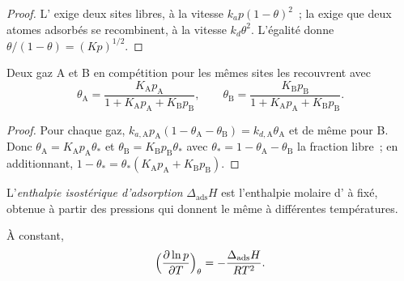 \begin{proof}
L' exige deux sites libres, à la vitesse $k_ap(1 - \theta)^2$~;
la  exige que deux atomes adsorbés se recombinent, à la
vitesse $k_d\theta^2$. L'égalité donne $\theta/(1 - \theta) =
(Kp)^{1/2}$.
\end{proof}

\begin{proposition}\label{prop:b3:surfaces-catalysis:competitive}
Deux gaz A et B en compétition pour les mêmes sites les recouvrent avec
\[
  \theta_{\mathrm A} = \frac{K_{\mathrm A}p_{\mathrm A}}{1 + K_{\mathrm A}p_{\mathrm A} + K_{\mathrm B}p_{\mathrm B}}, \qquad
  \theta_{\mathrm B} = \frac{K_{\mathrm B}p_{\mathrm B}}{1 + K_{\mathrm A}p_{\mathrm A} + K_{\mathrm B}p_{\mathrm B}} .
\]
\end{proposition}

\begin{proof}
Pour chaque gaz, $k_{a,\mathrm A}p_{\mathrm A}(1 - \theta_{\mathrm A} - \theta_{\mathrm B}) = k_{d,\mathrm A}\theta_{\mathrm A}$
et de même pour B. Donc
$\theta_{\mathrm A} = K_{\mathrm A}p_{\mathrm A}\theta_\ast$ et $\theta_{\mathrm B} = K_{\mathrm B}p_{\mathrm B}\theta_\ast$
avec $\theta_\ast = 1 - \theta_{\mathrm A} - \theta_{\mathrm B}$ la fraction
libre~; en additionnant,
$1 - \theta_\ast = \theta_\ast(K_{\mathrm A}p_{\mathrm A} + K_{\mathrm B}p_{\mathrm B})$.
\end{proof}

\begin{definition}\label{def:b3:surfaces-catalysis:isosteric}
L'\emph{enthalpie isostérique d'adsorption}
$\Delta_{\mathrm{ads}}H$ est l'enthalpie molaire d' à  fixé, obtenue à partir des pressions qui donnent le même
 à différentes températures.
\end{definition}

\begin{proposition}\label{prop:b3:surfaces-catalysis:isosteric}
À  constant,
\[
  \Bigl(\frac{\partial\ln p}{\partial T}\Bigr)_\theta = -\frac{\Delta_{\mathrm{ads}}H}{RT^2} .
\]
\end{proposition}

